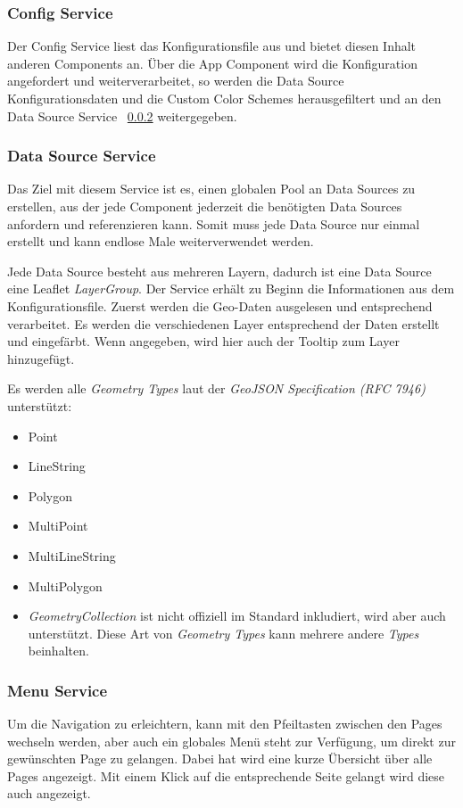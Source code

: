 \subsubsection{Config Service}
Der Config Service liest das Konfigurationsfile aus und bietet diesen Inhalt anderen Components an.
Über die App Component wird die Konfiguration angefordert und weiterverarbeitet, so werden die Data Source Konfigurationsdaten
und die Custom Color Schemes herausgefiltert und an den Data Source Service ~\ref{subsubsec:data-source-service} weitergegeben.

\subsubsection{Data Source Service}
\label{subsubsec:data-source-service}
Das Ziel mit diesem Service ist es, einen globalen Pool an Data Sources zu erstellen, aus der jede Component jederzeit die
benötigten Data Sources anfordern und referenzieren kann.
Somit muss jede Data Source nur einmal erstellt und kann endlose Male weiterverwendet werden.

Jede Data Source besteht aus mehreren Layern, dadurch ist eine Data Source eine Leaflet \emph{LayerGroup}.
Der Service erhält zu Beginn die Informationen aus dem Konfigurationsfile.
Zuerst werden die Geo-Daten ausgelesen und entsprechend verarbeitet.
Es werden die verschiedenen Layer entsprechend der Daten erstellt und eingefärbt.
Wenn angegeben, wird hier auch der Tooltip zum Layer hinzugefügt.

Es werden alle \emph{Geometry Types} laut der \emph{GeoJSON Specification (RFC 7946)}~\cite{rfc7946} unterstützt:

\begin{itemize}
    \item Point
    \item LineString
    \item Polygon
    \item MultiPoint
    \item MultiLineString
    \item MultiPolygon
    \item \emph{GeometryCollection} ist nicht offiziell im Standard inkludiert, wird aber auch unterstützt.
    Diese Art von \emph{Geometry Types} kann mehrere andere \emph{Types} beinhalten.
\end{itemize}

\subsubsection{Menu Service}
Um die Navigation zu erleichtern, kann mit den Pfeiltasten zwischen den Pages wechseln werden, aber auch ein globales Menü
steht zur Verfügung, um direkt zur gewünschten Page zu gelangen.
Dabei hat wird eine kurze Übersicht über alle Pages angezeigt.
Mit einem Klick auf die entsprechende Seite gelangt wird diese auch angezeigt.

